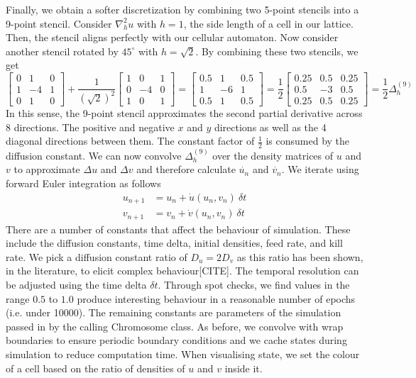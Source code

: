 Finally, we obtain a softer discretization by combining two 5-point stencils into a 9-point stencil. Consider $\nabla^2_h u$ with $h = 1$, the side length of a cell in our lattice. Then, the stencil aligns perfectly with our cellular automaton. Now consider another stencil rotated by $45^\circ$ with $h=\sqrt{2}$. By combining these two stencils, we get
\[
  \begin{bmatrix}
    0 & 1 & 0\\
    1 & -4 & 1\\
    0 & 1 & 0
  \end{bmatrix}
  + \frac{1}{(\sqrt{2})^2}
  \begin{bmatrix}
    1 & 0 & 1\\
    0 & -4 & 0\\
    1 & 0 & 1
  \end{bmatrix}
  = 
  \begin{bmatrix}
    0.5 & 1 & 0.5\\
    1 & -6 & 1\\
    0.5 & 1 & 0.5
  \end{bmatrix}
  = \frac{1}{2}
  \begin{bmatrix}
    0.25 & 0.5 & 0.25\\
    0.5 & -3 & 0.5\\
    0.25 & 0.5 & 0.25
  \end{bmatrix}
  = \frac{1}{2} \Delta^{(9)}_h 
\]
In this sense, the 9-point stencil approximates the second partial derivative across 8 directions. The positive and negative $x$ and $y$ directions as well as the 4 diagonal directions between them. The constant factor of $\frac{1}{2}$ is consumed by the diffusion constant. We can now convolve $\Delta^{(9)}_h$ over the density matrices of $u$ and $v$ to approximate $\Delta u$ and $\Delta v$ and therefore calculate $\dot{u_n}$ and $\dot{v_n}$. We iterate using forward Euler integration as follows
\begin{align*}
    u_{n+1} &= u_n + \dot{u}(u_n, v_n)\ \delta t\\
    v_{n+1} &= v_n + \dot{v}(u_n, v_n)\ \delta t
\end{align*}
There are a number of constants that affect the behaviour of simulation. These include the diffusion constants, time delta, initial densities, feed rate, and kill rate. We pick a diffusion constant ratio of $D_u = 2D_v$ as this ratio has been shown, in the literature, to elicit complex behaviour[CITE]. The temporal resolution can be adjusted using the time delta $\delta t$. Through spot checks, we find values in the range $0.5$ to $1.0$ produce interesting behaviour in a reasonable number of epochs (i.e. under 10000). The remaining constants are parameters of the simulation passed in by the calling Chromosome class. As before, we convolve with wrap boundaries to ensure periodic boundary conditions and we cache states during simulation to reduce computation time. When visualising state, we set the colour of a cell based on the ratio of densities of $u$ and $v$ inside it.\\

